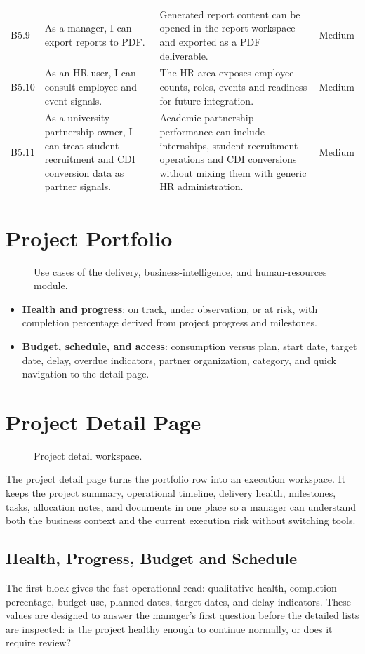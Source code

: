 \begin{longtable}{p{1.1cm}p{4.2cm}p{6.1cm}p{2.2cm}}
  B5.9 & As a manager, I can export reports to PDF. & Generated report content can be opened in the report workspace and exported as a PDF deliverable. & Medium \\
  B5.10 & As an HR user, I can consult employee and event signals. & The HR area exposes employee counts, roles, events and readiness for future integration. & Medium \\
  B5.11 & As a university-partnership owner, I can treat student recruitment and CDI conversion data as partner signals. & Academic partnership performance can include internships, student recruitment operations and CDI conversions without mixing them with generic HR administration. & Medium \\
  \bottomrule
\end{longtable}
\section{Project Portfolio}
\begin{figure}[htbp]
  \centering
  \caption{Use cases of the delivery, business-intelligence, and human-resources module.}
\end{figure}
\begin{itemize}
  \item \textbf{Health and progress}: on track, under observation, or at risk, with completion percentage derived from project progress and milestones.
  \item \textbf{Budget, schedule, and access}: consumption versus plan, start date, target date, delay, overdue indicators, partner organization, category, and quick navigation to the detail page.
\end{itemize}

\section{Project Detail Page}
\begin{figure}[htbp]
  \centering
  \caption{Project detail workspace.}
\end{figure}
The project detail page turns the portfolio row into an execution workspace. It keeps the project summary, operational timeline, delivery health, milestones, tasks, allocation notes, and documents in one place so a manager can understand both the business context and the current execution risk without switching tools.

\subsection{Health, Progress, Budget and Schedule}
The first block gives the fast operational read: qualitative health, completion percentage, budget use, planned dates, target dates, and delay indicators. These values are designed to answer the manager's first question before the detailed lists are inspected: is the project healthy enough to continue normally, or does it require review?

